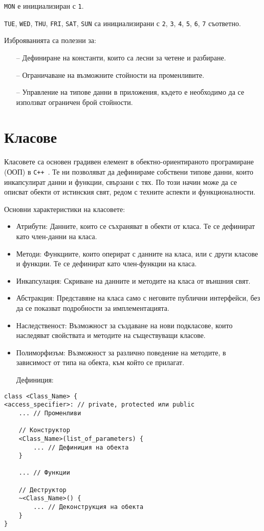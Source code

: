 \documentclass[oneside]{book}
\newcommand*{\code}[1]{\texttt{#1}}
\newcommand*{\cpp}{\texttt{C++}\ }
\begin{document}
\code{MON} е инициализиран с \code{1}.

\code{TUE}, \code{WED}, \code{THU}, \code{FRI}, \code{SAT}, \code{SUN} са инициализирани с \code{2}, \code{3}, \code{4}, \code{5}, \code{6}, \code{7} съответно.

Изброяванията са полезни за:
\begin{itemize}
    \item[--] Дефиниране на константи, които са лесни за четене и разбиране.
    \item[--] Ограничаване на възможните стойности на променливите.
    \item[--] Управление на типове данни в приложения, където е необходимо да се използват ограничен брой стойности.
\end{itemize}

\section{Класове}
Класовете са основен градивен елемент в обектно-ориентираното програмиране (ООП) в \cpp. Те ни позволяват да дефинираме собствени типове данни, които инкапсулират данни и функции, свързани с тях. По този начин може да се описват обекти от истинския свят, редом с техните аспекти и функционалности.

Основни характеристики на класовете:
\begin{itemize}
    \item Атрибути: Данните, които се съхраняват в обекти от класа. Те се дефинират като член-данни на класа.
    \item Методи: Функциите, които оперират с данните на класа, или с други класове и функции. Те се дефинират като член-функции на класа.
    \item Инкапсулация: Скриване на данните и методите на класа от външния свят.
    \item Абстракция: Представяне на класа само с неговите публични интерфейси, без да се показват подробности за имплементацията.
    \item Наследственост: Възможност за създаване на нови подкласове, които наследяват свойствата и методите на съществуващи класове.
    \item Полиморфизъм: Възможност за различно поведение на методите, в зависимост от типа на обекта, към който се прилагат.
\end{itemize}

\begin{itemize}\item[Дефиниция:]\end{itemize}
\begin{mdframed}\begin{lstlisting}
class <Class_Name> {
<access_specifier>: // private, protected или public
    ... // Променливи

    // Конструктор
    <Class_Name>(list_of_parameters) {
        ... // Дефиниция на обекта
    }

    ... // Функции

    // Деструктор
    ~<Class_Name>() {
        ... // Деконструкция на обекта
    }
}
\end{lstlisting}\end{mdframed}
\end{document}
